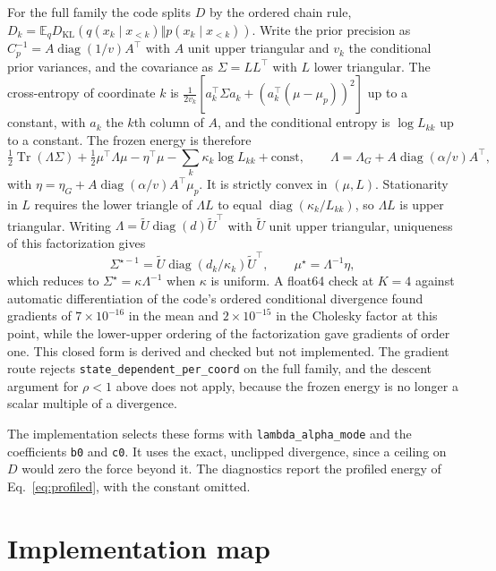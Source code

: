 \documentclass[11pt]{article}
\theoremstyle{definition}
\theoremstyle{remark}
\newcommand{\KL}{D_{\mathrm{KL}}}
\newcommand{\Tr}{\operatorname{Tr}}
\newcommand{\diag}{\operatorname{diag}}
\newcommand{\E}{\mathbb{E}}
\newcommand{\cfg}[1]{\texttt{#1}}
\begin{document}
For the full family the code splits $D$ by the ordered chain rule, $D_k=\E_q\KL(q(x_k\mid x_{<k})\Vert p(x_k\mid x_{<k}))$. Write the prior precision as $C_p^{-1}=A\diag(1/v)A^\top$ with $A$ unit upper triangular and $v_k$ the conditional prior variances, and the covariance as $\Sigma=LL^\top$ with $L$ lower triangular. The cross-entropy of coordinate $k$ is $\tfrac1{2v_k}[a_k^\top\Sigma a_k+(a_k^\top(\mu-\mu_p))^2]$ up to a constant, with $a_k$ the $k$th column of $A$, and the conditional entropy is $\log L_{kk}$ up to a constant. The frozen energy is therefore
\begin{equation}
\tfrac12\Tr(\Lambda\Sigma)+\tfrac12\mu^\top\Lambda\mu-\eta^\top\mu-\sum_k\kappa_k\log L_{kk}+\text{const},\qquad
\Lambda=\Lambda_G+A\diag(\alpha/v)A^\top,
\end{equation}
with $\eta=\eta_G+A\diag(\alpha/v)A^\top\mu_p$. It is strictly convex in $(\mu,L)$. Stationarity in $L$ requires the lower triangle of $\Lambda L$ to equal $\diag(\kappa_k/L_{kk})$, so $\Lambda L$ is upper triangular. Writing $\Lambda=\tilde U\diag(d)\tilde U^\top$ with $\tilde U$ unit upper triangular, uniqueness of this factorization gives
\begin{equation}
\Sigma^{\star-1}=\tilde U\diag(d_k/\kappa_k)\tilde U^\top,\qquad \mu^\star=\Lambda^{-1}\eta,
\end{equation}
which reduces to $\Sigma^\star=\kappa\Lambda^{-1}$ when $\kappa$ is uniform. A float64 check at $K=4$ against automatic differentiation of the code's ordered conditional divergence found gradients of $7\times10^{-16}$ in the mean and $2\times10^{-15}$ in the Cholesky factor at this point, while the lower-upper ordering of the factorization gave gradients of order one. This closed form is derived and checked but not implemented. The gradient route rejects \cfg{state\_dependent\_per\_coord} on the full family, and the descent argument for $\rho<1$ above does not apply, because the frozen energy is no longer a scalar multiple of a divergence.

The implementation selects these forms with \cfg{lambda\_alpha\_mode} and the coefficients \cfg{b0} and \cfg{c0}. It uses the exact, unclipped divergence, since a ceiling on $D$ would zero the force beyond it. The diagnostics report the profiled energy of Eq.~\eqref{eq:profiled}, with the constant omitted.

\section{Implementation map}
\label{sec:implementation}
\end{document}
